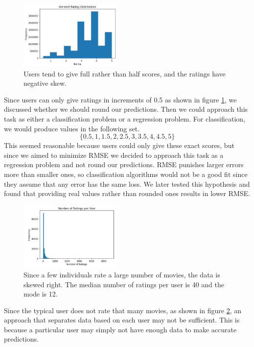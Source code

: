 \documentclass{sig-alternate-05-2015}
\begin{document}
\begin{figure}
    \begin{center}
        \includegraphics[width=2in]{RatingHistogram.png}
        \caption{Users tend to give full rather than half scores, and the ratings have negative skew.}
        \label{ratingdistribution}
    \end{center}
\end{figure}

Since users can only give ratings in increments of 0.5 as shown in figure \ref{ratingdistribution}, we discussed
whether we should round our predictions. Then we could approach this task as either a classification problem or
a regression problem. For classification, we would produce values in the following set.
\[\{0.5,1,1.5,2,2.5,3,3.5,4,4.5,5\}\]
This seemed reasonable because users could only give these exact scores, but since we aimed to minimize RMSE we
decided to approach this task as a regression problem and not round our predictions. RMSE punishes larger errors
more than smaller ones, so classification algorithms would not be a good fit since they assume that any error
has the same loss. We later tested this hypothesis and found that providing real values rather than rounded ones
results in lower RMSE.

\begin{figure}
    \begin{center}
        \includegraphics[width=2in]{NumRatingsPerUser.png}
        \caption{Since a few individuals rate a large number of movies, the data is skewed right. The median
        number of ratings per user is 40 and the mode is 12.}
        \label{ratingsperuser}
    \end{center}
\end{figure}

Since the typical user does not rate that many movies, as shown in figure \ref{ratingsperuser}, an approach that separates
data based on each user may not be sufficient. This is because a particular user may simply not have enough data
to make accurate predictions.
\end{document}
